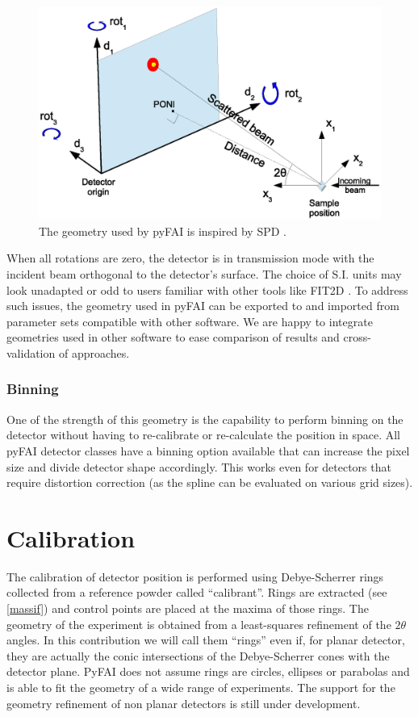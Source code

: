 \documentclass[preprint]{iucr}
\begin{document}
\begin{figure}
\label{PONI}
\begin{center}
\includegraphics[width=15cm]{PONI.eps}
\caption{The geometry used by pyFAI is inspired by SPD \cite{spd}.}
\end{center}
\end{figure}

When all rotations are zero, the detector is in transmission mode with the
incident beam orthogonal to the detector's surface.
The choice of S.I. units may look unadapted or odd to users familiar with
other tools like FIT2D \cite{fit2d}. To address such issues, the geometry used in pyFAI can be
exported to and imported from parameter sets compatible with other software.
We are happy to integrate geometries used in other software to ease 
comparison of results and cross-validation of approaches.

\subsubsection{Binning}
One of the strength of this geometry is the capability to perform binning on the
detector without having to re-calibrate or re-calculate the position in space.
All pyFAI detector classes have a binning option available that can increase the 
pixel size and divide detector shape accordingly.
This works even for detectors that require distortion correction (as the spline can be
evaluated on various grid sizes).

\section{Calibration}

The calibration of detector position is performed using Debye-Scherrer
rings collected from a reference powder called ``calibrant''.
Rings are extracted (see \ref{massif}) and control points are placed at the maxima
of those rings.
The geometry of the experiment is obtained from a least-squares refinement of
the $2\theta$ angles.
In this contribution we will call them ``rings'' even if, for planar detector,
they are actually the conic intersections of the Debye-Scherrer cones
with the detector plane.
PyFAI does not assume rings are circles, ellipses or parabolas and is able to
fit the geometry of a wide range of experiments.
The support for the geometry refinement of non planar detectors is still under
development.
\end{document}
